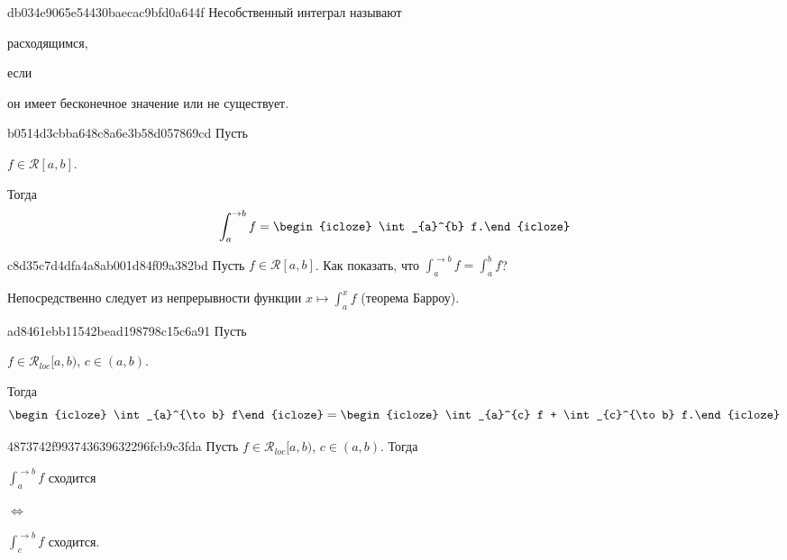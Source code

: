 \begin{note}{db034e9065e54430baecac9bfd0a644f}
    Несобственный интеграл называют \begin{icloze}{2}расходящимся,\end{icloze} если \begin{icloze}{1}он имеет бесконечное значение или не существует.\end{icloze}
\end{note}

\begin{note}{b0514d3cbba648c8a6e3b58d057869cd}
    Пусть \begin{icloze}{2}\({ f \in \mathcal R[a, b] }\).\end{icloze}
    Тогда
    \[
        \int_{a}^{\to b} f = \begin{icloze}{1}\int_{a}^{b} f.\end{icloze}
    \]
\end{note}

\begin{note}{c8d35c7d4dfa4a8ab001d84f09a382bd}
    Пусть \({ f \in \mathcal R[a, b] }\). Как показать, что \({ \int_{a}^{\to b} f = \int_{a}^{b} f }\)?

    \begin{cloze}{1}
        Непосредственно следует из непрерывности функции \({ x \mapsto \int_{a}^{x} f }\) (теорема Барроу).
    \end{cloze}
\end{note}

\begin{note}{ad8461ebb11542bead198798c15c6a91}
    Пусть \begin{icloze}{3}\({ f \in \mathcal R_{loc}[a, b) }\), \({ c \in (a, b) }\).\end{icloze}
    Тогда
    \[
        \begin{icloze}{2}\int_{a}^{\to b} f\end{icloze} = \begin{icloze}{1}\int_{a}^{c} f + \int_{c}^{\to b} f.\end{icloze}
    \]
\end{note}

\begin{note}{4873742f993743639632296fcb9c3fda}
    Пусть \({ f \in \mathcal R_{loc}[a, b) }\), \({ c \in (a, b) }\).
    Тогда
    \begin{center}
        \begin{icloze}{2}\({ \displaystyle \int_{a}^{\to b} f }\) сходится\end{icloze} \begin{icloze}{3}\({ \iff }\)\end{icloze} \begin{icloze}{1}\({ \displaystyle \int_{c}^{\to b} f }\) сходится.\end{icloze}
    \end{center}
\end{note}

